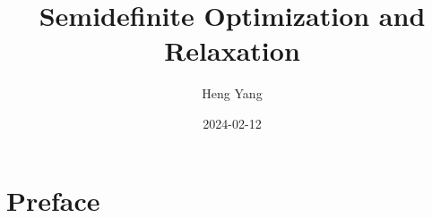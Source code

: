 \documentclass[
]{book}
\title{Semidefinite Optimization and Relaxation}
\author{Heng Yang}
\date{2024-02-12}
\theoremstyle{definition}
\theoremstyle{definition}
\theoremstyle{definition}
\theoremstyle{definition}
\theoremstyle{remark}
\begin{document}
\maketitle

{
\setcounter{tocdepth}{1}
\tableofcontents
}
\newcommand{\calQ}{\mathcal{Q}}
\newcommand{\calA}{\mathcal{A}}
\newcommand{\calK}{\mathcal{K}}
\newcommand{\calS}{\mathcal{S}}
\newcommand{\mathx}{\mathrm{x}}
\newcommand{\mathy}{\mathrm{y}}
\newcommand{\bbE}{\mathbb{E}}
\newcommand{\calN}{\mathcal{N}}

\newcommand{\Real}[1]{\mathbb{R}^{#1}}
\newcommand{\Comp}[1]{\mathbb{C}^{#1}}
\newcommand{\sym}[1]{\mathbb{S}^{#1}}
\newcommand{\psd}[1]{\sym{#1}_{+}}
\newcommand{\pd}[1]{\sym{#1}_{++}}
\newcommand{\inprod}[2]{\langle #1, #2 \rangle}
\newcommand{\linprod}[2]{\left\langle #1, #2 \right\rangle}
\newcommand{\trace}{\mathrm{tr}}
\newcommand{\tran}{^\top}

\newcommand{\rank}{\mathrm{rank}}
\newcommand{\diag}{\mathrm{diag}}
\newcommand{\Diag}{\mathrm{Diag}}
\newcommand{\BlkDiag}{\mathrm{BlkDiag}}
\newcommand{\vectorize}{\mathrm{vec}}
\newcommand{\svec}{\mathrm{svec}}
\newcommand{\mat}{\mathrm{mat}}
\newcommand{\smat}{\mathrm{smat}}
\newcommand{\norm}[1]{\Vert #1 \Vert}
\newcommand{\lnorm}[1]{\left\Vert #1 \right\Vert}
\newcommand{\pnorm}[2]{\Vert #1 \Vert_{#2}}
\newcommand{\Fnorm}[1]{\Vert #1 \Vert_\mathrm{F}}
\newcommand{\conv}{\mathrm{conv}}
\newcommand{\cone}{\mathrm{cone}}
\newcommand{\interior}{\mathrm{int}}
\newcommand{\relint}{\mathrm{ri}}
\newcommand{\poly}[1]{\mathbb{R}[#1]}
\newcommand{\SOd}{\mathrm{SO}(d)}
\newcommand{\SOthree}{\mathrm{SO}(3)}
\newcommand{\Od}{\mathrm{O}(d)}
\newcommand{\Ogroup}{\mathrm{O}}
\newcommand{\usphere}{\mathcal{S}}
\newcommand{\bmath}[1]{\boldsymbol{#1}}
\newcommand{\lbrkt}{[\![}
\newcommand{\rbrkt}{]\!]}
\newcommand{\brkt}[1]{\lbrkt #1 \rbrkt}
\newcommand{\bracket}[1]{[ #1 ]}
\newcommand{\sign}{\mathrm{sgn}}

\newcommand{\cbrace}[1]{\{ #1 \}}
\newcommand{\lcbrace}[1]{ \left\{ #1 \right\} }
\newcommand{\aff}{\mathrm{aff}}
\newcommand{\bbN}{\mathbb{N}}
\newcommand{\dist}{\mathrm{dist}}
\newcommand{\subject}{\mathrm{s.t.}}
\newcommand{\cl}{\mathrm{cl}}
\newcommand{\eye}{\mathrm{I}}
\newcommand{\inv}{^{-1}}
\newcommand{\Range}{\mathrm{Range}}
\renewcommand{\ker}{\mathrm{ker}}
\newcommand{\face}{\mathrm{face}}
\newcommand{\lmid}{\ \middle\vert\ }
\renewcommand{\Re}{\mathrm{Re}}

\hypertarget{preface}{%
\chapter*{Preface}\label{preface}}
\end{document}
